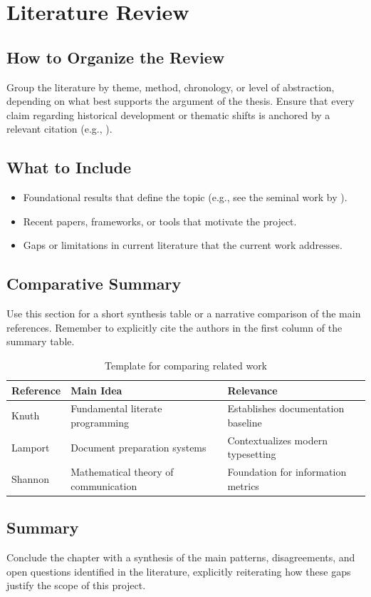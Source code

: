 \chapter{Literature Review}

\section{How to Organize the Review}

Group the literature by theme, method, chronology, or level of abstraction, depending on what best supports the argument of the thesis. Ensure that every claim regarding historical development or thematic shifts is anchored by a relevant citation (e.g., \cite{knuth1984, lamport1994}).

\section{What to Include}

\begin{itemize}
    \item Foundational results that define the topic (e.g., see the seminal work by \cite{shannon1948}).
    \item Recent papers, frameworks, or tools that motivate the project.
    \item Gaps or limitations in current literature that the current work addresses.
\end{itemize}

\section{Comparative Summary}

Use this section for a short synthesis table or a narrative comparison of the main references. Remember to explicitly cite the authors in the first column of the summary table.

\begin{table}[h!]
\centering
\caption{Template for comparing related work}
\label{tab:related-work-template}
\begin{tabularx}{\textwidth}{lXX}
\toprule
Reference & Main Idea & Relevance \\
\midrule
Knuth \cite{knuth1984}   & Fundamental literate programming  & Establishes documentation baseline \\
Lamport \cite{lamport1994} & Document preparation systems     & Contextualizes modern typesetting \\
Shannon \cite{shannon1948} & Mathematical theory of communication & Foundation for information metrics \\
\bottomrule
\end{tabularx}
\end{table}

\section{Summary}

Conclude the chapter with a synthesis of the main patterns, disagreements, and open questions identified in the literature, explicitly reiterating how these gaps justify the scope of this project.